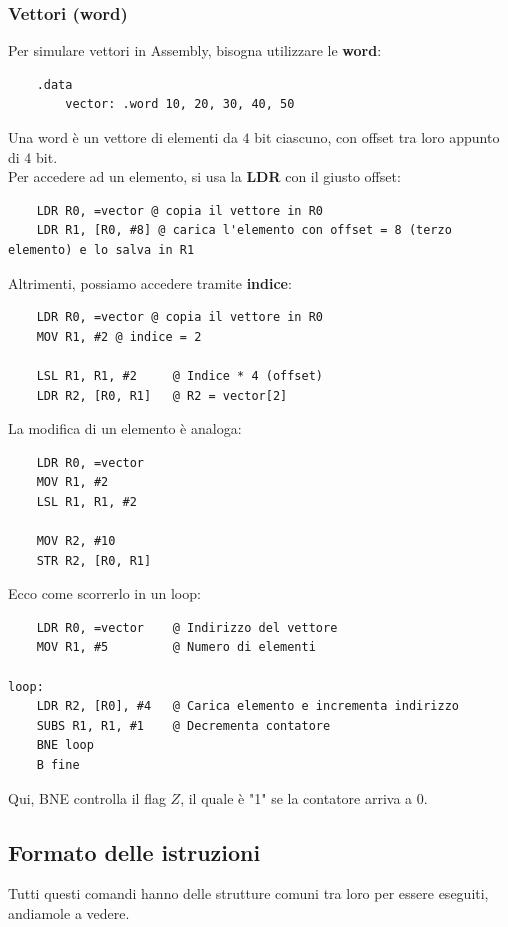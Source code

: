 \documentclass[12pt,a4paper]{article}
\begin{document}
\subsubsection{Vettori (word)}
Per simulare vettori in Assembly, bisogna utilizzare le \textbf{word}:
\begin{lstlisting}
    .data
        vector: .word 10, 20, 30, 40, 50
\end{lstlisting}
Una word è un vettore di elementi da $4$ bit ciascuno, con offset tra loro appunto di $4$ bit.\\
Per accedere ad un elemento, si usa la \textbf{LDR} con il giusto offset:
\begin{lstlisting}
    LDR R0, =vector @ copia il vettore in R0
    LDR R1, [R0, #8] @ carica l'elemento con offset = 8 (terzo elemento) e lo salva in R1
\end{lstlisting}
Altrimenti, possiamo accedere tramite \textbf{indice}:
\begin{lstlisting}
    LDR R0, =vector @ copia il vettore in R0
    MOV R1, #2 @ indice = 2

    LSL R1, R1, #2     @ Indice * 4 (offset)
    LDR R2, [R0, R1]   @ R2 = vector[2]
\end{lstlisting}
La modifica di un elemento è analoga:
\begin{lstlisting}
    LDR R0, =vector 
    MOV R1, #2 
    LSL R1, R1, #2  

    MOV R2, #10   
    STR R2, [R0, R1]   
\end{lstlisting}
Ecco come scorrerlo in un loop:
\begin{lstlisting}
    LDR R0, =vector    @ Indirizzo del vettore
    MOV R1, #5         @ Numero di elementi

loop:
    LDR R2, [R0], #4   @ Carica elemento e incrementa indirizzo
    SUBS R1, R1, #1    @ Decrementa contatore
    BNE loop
    B fine
\end{lstlisting}
Qui, BNE controlla il flag $Z$, il quale è "1" se la contatore arriva a 0.

\subsection{Formato delle istruzioni}
Tutti questi comandi hanno delle strutture comuni tra loro per essere eseguiti, andiamole a vedere.\\
\end{document}
